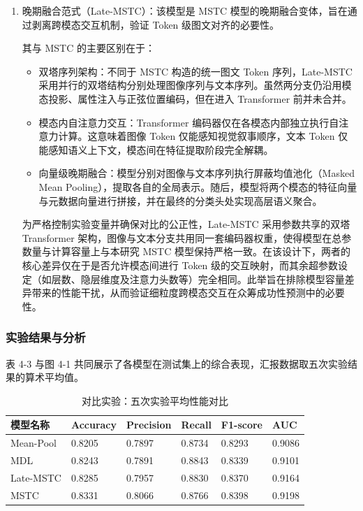 \begin{enumerate}[label=(\arabic*)]
与本研究不同，MDL 不以 Transformer 显式建模序列，其表现将更多反映卷积结构对局部模式的表征能力。

  \item 晚期融合范式（Late-MSTC）：该模型是 MSTC 模型的晚期融合变体，旨在通过剥离跨模态交互机制，验证 Token 级图文对齐的必要性。

其与 MSTC 的主要区别在于：

\begin{itemize}
  \item 双塔序列架构：不同于 MSTC 构造的统一图文 Token 序列，Late-MSTC 采用并行的双塔结构分别处理图像序列与文本序列。虽然两分支仍沿用模态投影、属性注入与正弦位置编码，但在进入 Transformer 前并未合并。
  \item 模态内自注意力交互：Transformer 编码器仅在各模态内部独立执行自注意力计算。这意味着图像 Token 仅能感知视觉叙事顺序，文本 Token 仅能感知语义上下文，模态间在特征提取阶段完全解耦。
  \item 向量级晚期融合：模型分别对图像与文本序列执行屏蔽均值池化（Masked Mean Pooling），提取各自的全局表示。随后，模型将两个模态的特征向量与元数据向量进行拼接，并在最终的分类头处实现高层语义聚合。
\end{itemize}

为严格控制实验变量并确保对比的公正性，Late-MSTC 采用参数共享的双塔 Transformer 架构，图像与文本分支共用同一套编码器权重，使得模型在总参数量与计算容量上与本研究 MSTC 模型保持严格一致。在该设计下，两者的核心差异仅在于是否允许模态间进行 Token 级的交互映射，而其余超参数设定（如层数、隐层维度及注意力头数等）完全相同。此举旨在排除模型容量差异带来的性能干扰，从而验证细粒度跨模态交互在众筹成功性预测中的必要性。
\end{enumerate}

\subsubsection{实验结果与分析}
表 4-3 与图 4-1 共同展示了各模型在测试集上的综合表现，汇报数据取五次实验结果的算术平均值。


\begin{table}[H]
\centering
\caption{对比实验：五次实验平均性能对比}
\label{tab:exp4_3}
\begin{tabular}{@{}llllll@{}}
\toprule
\textbf{模型名称} & \textbf{Accuracy} & \textbf{Precision} & \textbf{Recall} & \textbf{F1-score} & \textbf{AUC} \\ \midrule
Mean-Pool & 0.8205 & 0.7897 & 0.8734 & 0.8293 & 0.9086 \\
MDL & 0.8243 & 0.7891 & 0.8843 & 0.8339 & 0.9101 \\
Late-MSTC & 0.8285 & 0.7957 & 0.8830 & 0.8370 & 0.9164 \\
MSTC & 0.8331 & 0.8066 & 0.8766 & 0.8398 & 0.9198 \\ \bottomrule
\end{tabular}
\end{table}



